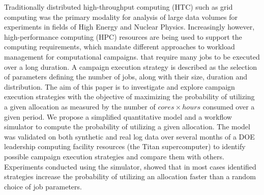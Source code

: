 Traditionally distributed high-throughput computing (HTC) such as grid
computing was the primary modality for analysis of large data volumes for
experiments in fields of High Energy and Nuclear Physics. Increasingly
however, high-performance computing (HPC) resources are being used to support
the computing requirements, which mandate different approaches to workload
management for computational campaigns. that require many jobs to be executed
over a long duration.
A campaign execution strategy is described as the selection of parameters
defining the number of jobs, along with their size, duration and distribution.
The aim of this paper is to investigate and explore campaign execution
strategies with the objective of maximizing the probability of utilizing a
given allocation as measured by the number of $cores \times hours$ consumed
over a given period.
We propose a simplified quantitative model and a workflow simulator to compute
the probability of utilizing a given allocation.
The model was validated on both synthetic and real log data over several
months of a DOE leadership computing facility resources (the Titan
supercomputer) to identify possible campaign execution strategies and
compare them with others.
Experiments conducted using the simulator, showed that in most cases
identified strategies increase the probability of utilizing an allocation
faster than a random choice of job parameters.


